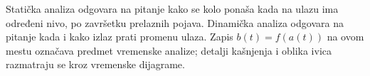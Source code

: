 Statička analiza odgovara na pitanje kako se kolo ponaša kada na ulazu ima određeni nivo, po završetku prelaznih pojava. Dinamička analiza odgovara na pitanje kada i kako izlaz prati promenu ulaza. Zapis $b(t)=f(a(t))$ na ovom mestu označava predmet vremenske analize; detalji kašnjenja i oblika ivica razmatraju se kroz vremenske dijagrame.
